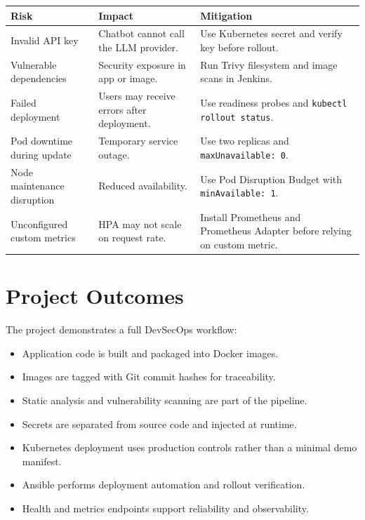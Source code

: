 \documentclass[12pt,a4paper]{article}
\begin{document}
\begin{longtable}{>{\raggedright\arraybackslash}p{4cm} >{\raggedright\arraybackslash}p{5cm} >{\raggedright\arraybackslash}p{4cm}}
\toprule
\textbf{Risk} & \textbf{Impact} & \textbf{Mitigation} \\
\midrule
Invalid API key & Chatbot cannot call the LLM provider. & Use Kubernetes secret and verify key before rollout. \\
Vulnerable dependencies & Security exposure in app or image. & Run Trivy filesystem and image scans in Jenkins. \\
Failed deployment & Users may receive errors after deployment. & Use readiness probes and \texttt{kubectl rollout status}. \\
Pod downtime during update & Temporary service outage. & Use two replicas and \texttt{maxUnavailable: 0}. \\
Node maintenance disruption & Reduced availability. & Use Pod Disruption Budget with \texttt{minAvailable: 1}. \\
Unconfigured custom metrics & HPA may not scale on request rate. & Install Prometheus and Prometheus Adapter before relying on custom metric. \\
\bottomrule
\end{longtable}

\section{Project Outcomes}

The project demonstrates a full DevSecOps workflow:

\begin{itemize}[leftmargin=*]
    \item Application code is built and packaged into Docker images.
    \item Images are tagged with Git commit hashes for traceability.
    \item Static analysis and vulnerability scanning are part of the pipeline.
    \item Secrets are separated from source code and injected at runtime.
    \item Kubernetes deployment uses production controls rather than a minimal demo manifest.
    \item Ansible performs deployment automation and rollout verification.
    \item Health and metrics endpoints support reliability and observability.
\end{itemize}
\end{document}
